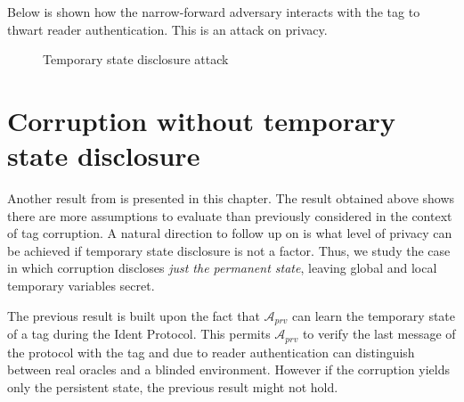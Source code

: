     Below is shown how the narrow-forward adversary interacts with the tag to thwart reader authentication. This is an attack on privacy.

    \begin{figure}[H]

    \hspace*{0cm}
    \caption{Temporary state disclosure attack}
    \end{figure}

\section{Corruption without temporary state disclosure}

    Another result from \cite{Impossibility_results} is presented in this chapter. 
    The result obtained above shows there are more assumptions to evaluate than
    previously considered in the context of tag corruption. A natural direction
    to follow up on is what level of privacy can be achieved if temporary state
    disclosure is not a factor. Thus, we study the case in which corruption discloses 
    \textit{just the permanent state}, leaving global and local temporary variables
    secret.

    The previous result is built upon the fact that $\mathcal{A}_{prv}$ can learn the
    temporary state of a tag during the Ident Protocol. This permits $\mathcal{A}_{prv}$
    to verify the last message of the protocol with the tag and due to reader authentication
    can distinguish between real oracles and a blinded environment. However if the corruption
    yields only the persistent state, the previous result might not hold.
    
